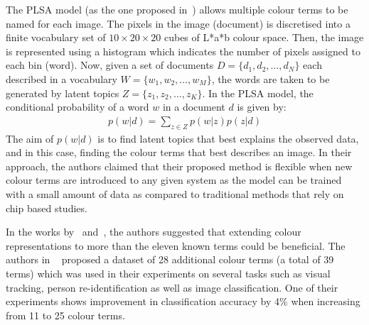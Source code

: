 The PLSA model (as the one proposed in~\cite{van2009learning}) allows multiple colour terms to be named for each image. The pixels in the image (document) is discretised into a finite vocabulary set of $10 \times 20 \times 20$ cubes of L*a*b colour space. Then, the image is represented using a histogram which indicates the number of pixels assigned to each bin (word). Now, given a set of documents $D = \{d_1, d_2, \ldots, d_N\}$ each described in a vocabulary $W = \{w_1, w_2, \ldots, w_M\}$, the words are taken to be generated by latent topics $Z = \{z_1, z_2, \ldots, z_K\}$. In the PLSA model, the conditional probability of a word $w$ in a document $d$ is given by: 
\begin{align} 
    p(w|d) = \sum_{z\in Z}{p(w|z)p(z|d)}
\end{align} 
The aim of $p(w|d)$ is to find latent topics that best explains the observed data, and in this case, finding the colour terms that best describes an image. In their approach, the authors claimed that their proposed method is flexible when new colour terms are introduced to any given system as the model can be trained with a small amount of data as compared to traditional methods that rely on chip based studies.

In the works by~ and~, the authors suggested that extending colour representations to more than the eleven known terms could be beneficial. The authors in ~\cite{yu2018beyond} proposed a dataset of 28 additional colour terms (a total of 39 terms) which was used in their experiments on several tasks such as visual tracking, person re-identification as well as image classification. One of their experiments shows improvement in classification accuracy by 4\% when increasing from 11 to 25 colour terms.

